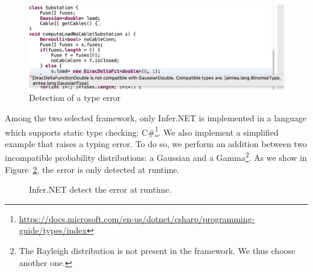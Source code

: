 \begin{figure}
    \centering
    \includegraphics[width=0.9\linewidth]{img/chapt-aintea/valid/ErrorHandling-Refactoring}
    \caption{Detection of a type error}
    \label{fig:valid-error-handling}
\end{figure}

Among the two selected framework, only Infer.NET is implemented in a language which supports static type checking: C\#\footnote{\url{https://docs.microsoft.com/en-us/dotnet/csharp/programming-guide/types/index}}.
We also implement a simplified example that raises a typing error.
To do so, we perform an addition between two incompatible probability distributions: a Gaussian and a Gamma\footnote{The Rayleigh distribution is not present in the framework. We thus choose another one.}.
As we show in Figure~\ref{fig:valid-error-handling-csharp-global}, the error is only detected at runtime.

\begin{figure}[ht]
	\centering
	\hfill
	\hfill
	\caption{Infer.NET detect the error at runtime.}
	\label{fig:valid-error-handling-csharp-global}
\end{figure}

